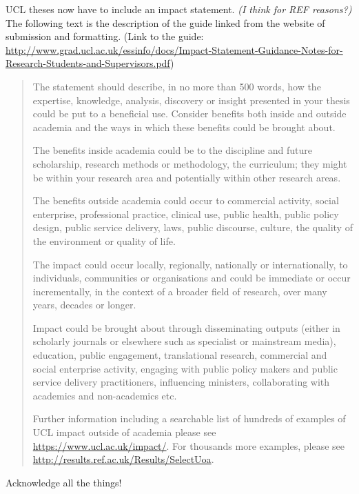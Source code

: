 \begin{impactstatement}

	UCL theses now have to include an impact statement. \textit{(I think for REF reasons?)} The following text is the description of the guide linked from the website of submission and formatting. (Link to the guide: {\scriptsize \url{http://www.grad.ucl.ac.uk/essinfo/docs/Impact-Statement-Guidance-Notes-for-Research-Students-and-Supervisors.pdf}})

\begin{quote}
The statement should describe, in no more than 500 words, how the expertise, knowledge, analysis,
discovery or insight presented in your thesis could be put to a beneficial use. Consider benefits both
inside and outside academia and the ways in which these benefits could be brought about.

The benefits inside academia could be to the discipline and future scholarship, research methods or
methodology, the curriculum; they might be within your research area and potentially within other
research areas.

The benefits outside academia could occur to commercial activity, social enterprise, professional
practice, clinical use, public health, public policy design, public service delivery, laws, public
discourse, culture, the quality of the environment or quality of life.

The impact could occur locally, regionally, nationally or internationally, to individuals, communities or
organisations and could be immediate or occur incrementally, in the context of a broader field of
research, over many years, decades or longer.

Impact could be brought about through disseminating outputs (either in scholarly journals or
elsewhere such as specialist or mainstream media), education, public engagement, translational
research, commercial and social enterprise activity, engaging with public policy makers and public
service delivery practitioners, influencing ministers, collaborating with academics and non-academics
etc.

Further information including a searchable list of hundreds of examples of UCL impact outside of
academia please see \url{https://www.ucl.ac.uk/impact/}. For thousands more examples, please see
\url{http://results.ref.ac.uk/Results/SelectUoa}.
\end{quote}
\end{impactstatement}

        
\begin{acknowledgements}

Acknowledge all the things!

\end{acknowledgements}

